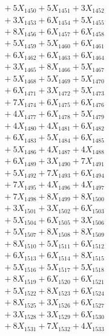 \documentclass[a4paper,10pt]{article}
\begin{document}
{\begin{align}
&\;  + 5 X_{1450} + 5 X_{1451} + 3 X_{1452} \\[0.3ex]
&\;  + 3 X_{1453} + 6 X_{1454} + 5 X_{1455} \\[0.3ex]
&\;  + 8 X_{1456} + 6 X_{1457} + 6 X_{1458} \\[0.3ex]
&\;  + 5 X_{1459} + 5 X_{1460} + 6 X_{1461} \\[0.3ex]
&\;  + 6 X_{1462} + 6 X_{1463} + 6 X_{1464} \\[0.3ex]
&\;  + 3 X_{1465} + 8 X_{1466} + 5 X_{1467} \\[0.3ex]
&\;  + 5 X_{1468} + 5 X_{1469} + 5 X_{1470} \\[0.3ex]
&\;  + 6 X_{1471} + 3 X_{1472} + 5 X_{1473} \\[0.3ex]
&\;  + 7 X_{1474} + 6 X_{1475} + 6 X_{1476} \\[0.3ex]
&\;  + 4 X_{1477} + 6 X_{1478} + 5 X_{1479} \\[0.5ex]\allowbreak
&\;  + 4 X_{1480} + 4 X_{1481} + 6 X_{1482} \\[0.3ex]
&\;  + 6 X_{1483} + 5 X_{1484} + 6 X_{1485} \\[0.3ex]
&\;  + 5 X_{1486} + 4 X_{1487} + 4 X_{1488} \\[0.3ex]
&\;  + 6 X_{1489} + 3 X_{1490} + 7 X_{1491} \\[0.3ex]
&\;  + 5 X_{1492} + 7 X_{1493} + 6 X_{1494} \\[0.3ex]
&\;  + 7 X_{1495} + 4 X_{1496} + 4 X_{1497} \\[0.3ex]
&\;  + 7 X_{1498} + 8 X_{1499} + 8 X_{1500} \\[0.3ex]
&\;  + 3 X_{1501} + 3 X_{1502} + 6 X_{1503} \\[0.3ex]
&\;  + 5 X_{1504} + 6 X_{1505} + 3 X_{1506} \\[0.3ex]
&\;  + 5 X_{1507} + 8 X_{1508} + 8 X_{1509} \\[0.5ex]\allowbreak
&\;  + 8 X_{1510} + 5 X_{1511} + 6 X_{1512} \\[0.3ex]
&\;  + 6 X_{1513} + 6 X_{1514} + 8 X_{1515} \\[0.3ex]
&\;  + 5 X_{1516} + 5 X_{1517} + 5 X_{1518} \\[0.3ex]
&\;  + 8 X_{1519} + 6 X_{1520} + 6 X_{1521} \\[0.3ex]
&\;  + 5 X_{1522} + 8 X_{1523} + 6 X_{1524} \\[0.3ex]
&\;  + 8 X_{1525} + 3 X_{1526} + 6 X_{1527} \\[0.3ex]
&\;  + 3 X_{1528} + 3 X_{1529} + 6 X_{1530} \\[0.3ex]
&\;  + 8 X_{1531} + 7 X_{1532} + 4 X_{1533} \\[0.3ex]

\end{align}}
\end{document}

